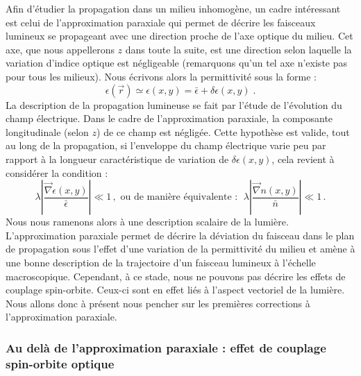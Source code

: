 \documentclass[a4paper,11pt]{article} %
\begin{document}
	Afin d'étudier la propagation dans un milieu inhomogène, un cadre intéressant est celui de l'approximation paraxiale qui permet de décrire les faisceaux lumineux se propageant avec une direction proche de l'axe optique du milieu. Cet axe, que nous appellerons $ z $ dans toute la suite, est une direction selon laquelle la variation d'indice optique est négligeable (remarquons qu'un tel axe n'existe pas pour tous les milieux). Nous écrivons alors la permittivité sous la forme :
	\begin{equation*}
		\epsilon(\vec{r}) \simeq \epsilon(x,y) = \bar{\epsilon} + \delta \epsilon(x,y) \; .
	\end{equation*}
	La description de la propagation lumineuse se fait par l'étude de l'évolution du champ électrique. Dans le cadre de l'approximation paraxiale, la composante longitudinale (selon $ z $) de ce champ est négligée. Cette hypothèse est valide, tout au long de la propagation, si l'enveloppe du champ électrique varie peu par rapport à la longueur caractéristique de variation de $\delta \epsilon (x,y)$, cela revient à considérer la condition : 
	\begin{equation}
		\label{hyp_var_epsilon}
		\lambda \left| \frac{\vec{\nabla}\epsilon(x,y)}{\bar{\epsilon}} \right| \ll 1 \, , \text{ ou de manière équivalente : } \; \lambda \left| \frac{\vec{\nabla}n(x,y)}{\bar{n}} \right| \ll 1 \, .
	\end{equation}
	Nous nous ramenons alors à une description scalaire de la lumière.\\
	
	L'approximation paraxiale permet de décrire la déviation du faisceau dans le plan de propagation sous l'effet d'une variation de la permittivité du milieu et amène à une bonne description de la trajectoire d'un faisceau lumineux à l'échelle macroscopique. Cependant, à ce stade, nous ne pouvons pas décrire les effets de couplage spin-orbite. Ceux-ci sont en effet liés à l'aspect vectoriel de la lumière. Nous allons donc à présent nous pencher sur les premières corrections à l'approximation paraxiale.
	
	\subsubsection{Au delà de l'approximation paraxiale : effet de couplage spin-orbite optique}
	
\end{document}
